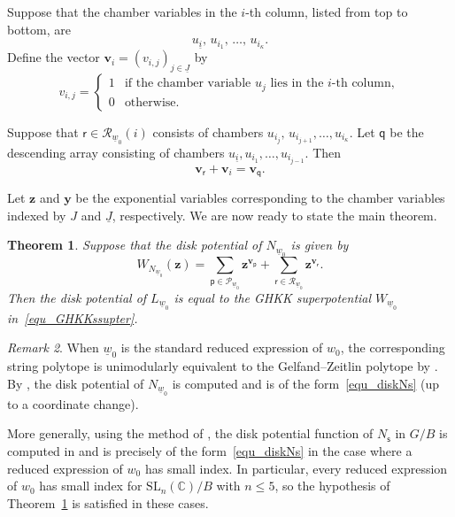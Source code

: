 \documentclass[11pt]{amsart}
\theoremstyle{plain}
\newtheorem{theorem}{Theorem}[section]
\theoremstyle{definition}
\theoremstyle{remark}
\newtheorem{remark}[theorem]{Remark}
\newcommand{\C}{\mathbb{C}}
\numberwithin{equation}{section} \numberwithin{table}{section}
\numberwithin{equation}{section}
\begin{document}
Suppose that the chamber variables in the $i$-th column, listed from top to bottom, are
$$
u_{\underline{i}},\, u_{i_1},\, \dots,\, u_{i_\kappa}.
$$
Define the vector $\mathbf{v}_i=(v_{i,j})_{j\in\underline{J}}$ by
$$
v_{i,j} =
\begin{cases}
1 &\mbox{if the chamber variable $u_j$ lies in the $i$-th column}, \\
0 &\mbox{otherwise.}
\end{cases}
$$

Suppose that $\mathsf{r} \in \mathcal{R}_{\underline{w}_0}(i)$ consists of chambers $u_{i_j},\,u_{i_{j+1}}, \dots, u_{i_\kappa}$. Let $\mathsf{q}$ be the descending array consisting of chambers $u_{\underline{i}}, u_{i_1}, \dots, u_{i_{j-1}}$. Then 
\begin{equation}\label{equ_inwardsum}
\mathbf{v}_\mathsf{r} + \mathbf{v}_i = \mathbf{v}_\mathsf{q}.
\end{equation}

Let $\mathbf{z}$ and $\mathbf{y}$ be the exponential variables corresponding to the chamber variables indexed by $J$ and $\underline{J}$, respectively. We are now ready to state the main theorem.

\begin{theorem}\label{theorem_GHKKdisk}
Suppose that the disk potential of $N_{\underline{w}_0}$ is given by
\begin{equation}\label{equ_diskNs}
W_{N_{\underline{w}_0}}(\mathbf{z}) =  \sum_{\mathsf{p} \in \mathcal{P}_{\underline{w}_0}} \mathbf{z}^{\mathbf{v}_\mathsf{p}} + \sum_{\mathsf{r} \in \mathcal{R}_{\underline{w}_0}}  \mathbf{z}^{\mathbf{v}_\mathsf{r}}.
\end{equation}
Then the disk potential of $L_{\underline{w}_0}$ is equal to the GHKK superpotential $W_{\underline{w}_0}$ in~\eqref{equ_GHKKssupter}.
\end{theorem}

\begin{remark}
When $\underline{w}_0$ is the standard reduced expression of $w_0$, the corresponding string polytope is unimodularly equivalent to the Gelfand--Zeitlin polytope by \cite{Lit98}. By \cite{NNU10}, the disk potential of $N_{\underline{w}_0}$ is computed and is of the form~\eqref{equ_diskNs} (up to a coordinate change). 

More generally, using the method of \cite{NNU10}, the disk potential function of $N_\mathsf{s}$ in $G/B$ is computed in \cite{CKLP23} and is precisely of the form~\eqref{equ_diskNs} in the case where a reduced expression of $w_0$ has small index. In particular, every reduced expression of $w_0$ has small index for $\mathrm{SL}_n(\C)/B$ with $n \le 5$, so the hypothesis of Theorem~\ref{theorem_GHKKdisk} is satisfied in these cases.
\end{remark}
\end{document}

